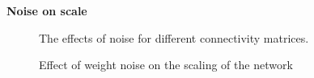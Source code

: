 \documentclass[10pt,a4paper]{article}
\begin{document}
\textbf{Noise on scale}

\begin{figure}[H]
    \centering
    \qquad
    \caption{The effects of noise for different connectivity matrices. }
	\label{fig:current_noise_scale}
\end{figure}

\begin{figure}[H]
    \centering
    \qquad
	\caption{Effect of weight noise on the scaling of the network}
	\label{fig:matrix_noise_scale}
\end{figure}
\end{document}
